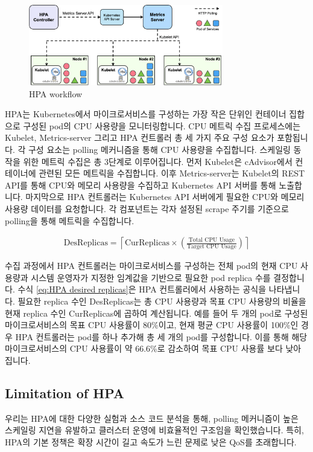 \documentclass[conference]{IEEEtran}
\begin{document}
\begin{figure}[ht]
    \centerline{\includegraphics[width=8.5cm]{images/background/k8s_system_design.png}}
    \caption{HPA workflow}
    \label{fig:hpa system design}
\end{figure}

HPA는 Kubernetes에서 마이크로서비스를 구성하는 가장 작은 단위인 컨테이너 집합으로 구성된 pod의 CPU 사용량을 모니터링합니다. CPU 메트릭 수집 프로세스에는 Kubelet, Metrics-server 그리고 HPA 컨트롤러 총 세 가지 주요 구성 요소가 포함됩니다. 각 구성 요소는 polling 메커니즘을 통해 CPU 사용량을 수집합니다. 스케일링 동작을 위한 메트릭 수집은 총 3단계로 이루어집니다. 먼저 Kubelet은 cAdvisor\cite{cAdvisorGithub}에서 컨테이너에 관련된 모든 메트릭을 수집합니다. 이후 Metrics-server는 Kubelet의 REST API를 통해 CPU와 메모리 사용량을 수집하고 Kubernetes API 서버를 통해 노출합니다. 마지막으로 HPA 컨트롤러는 Kubernetes API 서버에게 필요한 CPU와 메모리 사용량 데이터를 요청합니다. 각 컴포넌트는 각자 설정된 scrape 주기를 기준으로 polling을 통해 메트릭을 수집합니다.

\begin{align}
    \label{eq:HPA desired replicas}
    \text{DesReplicas} = \left\lceil \text{CurReplicas} \times \left( \frac{\text{Total CPU Usage}}{\text{Target CPU Usage}} \right) \right\rceil
\end{align}

수집 과정에서 HPA 컨트롤러는 마이크로서비스를 구성하는 전체 pod의 현재 CPU 사용량과 시스템 운영자가 지정한 임계값을 기반으로 필요한 pod replica 수를 결정합니다\cite{KubernetesHPA}. 수식 \ref{eq:HPA desired replicas}은 HPA 컨트롤러에서 사용하는 공식을 나타냅니다. 필요한 replica 수인 DesReplicas는 총 CPU 사용량과 목표 CPU 사용량의 비율을 현재 replica 수인 CurReplicas에 곱하여 계산됩니다. 예를 들어 두 개의 pod로 구성된 마이크로서비스의 목표 CPU 사용률이 80\%이고, 현재 평균 CPU 사용률이 100\%인 경우 HPA 컨트롤러는 pod를 하나 추가해 총 세 개의 pod를 구성합니다. 이를 통해 해당 마이크로서비스의 CPU 사용률이 약 66.6\%로 감소하여 목표 CPU 사용률 보다 낮아집니다.


\subsection{Limitation of HPA}
우리는 HPA에 대한 다양한 실험과 소스 코드 분석을 통해, polling 메커니즘이 높은 스케일링 지연을 유발하고 클러스터 운영에 비효율적인 구조임을 확인했습니다. 특히, HPA의 기본 정책은 확장 시간이 길고 속도가 느린 문제로 낮은 QoS를 초래합니다\cite{huo2023high}.
\end{document}
